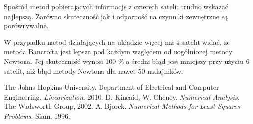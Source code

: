 \documentclass{article}
\begin{document}
\par Spośród metod pobierających informacje z czterech satelit trudno wskazać najlepszą. Zarówno skuteczność jak i odporność na czynniki zewnętrzne są porównywalne.

\par W przypadku metod działających na układzie więcej niż 4 satelit widać, że metoda Bancrofta jest lepsza pod każdym względem od uogólnionej metody Newtona. Jej skuteczność wynosi 100 \% a średni błąd jest mniejszy przy użyciu 6 satelit, niż błąd metody Newtona dla nawet 50 nadajników.


\begin{thebibliography}{100}
 The Johns Hopkins University. Department of Electrical and Computer Engineering. \emph{Linearization}. 2010.
 D. Kincaid, W. Cheney. \emph{Numerical Analysis}. The Wadsworth Group, 2002.
 A. Bjorck. \emph{Numerical Methods for Least Squares Problems}. Siam, 1996.
\end{thebibliography}
\end{document}
